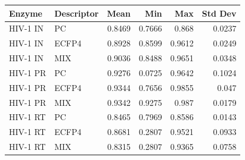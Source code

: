 \begin{tabular}{llrrrr}
\toprule
Enzyme & Descriptor & Mean & Min & Max & Std Dev \\
\midrule
HIV-1 IN & PC & 0.8469 & 0.7666 & 0.868 & 0.0237 \\
HIV-1 IN & ECFP4 & 0.8928 & 0.8599 & 0.9612 & 0.0249 \\
HIV-1 IN & MIX & 0.9036 & 0.8488 & 0.9651 & 0.0348 \\
HIV-1 PR & PC & 0.9276 & 0.0725 & 0.9642 & 0.1024 \\
HIV-1 PR & ECFP4 & 0.9344 & 0.7656 & 0.9855 & 0.047 \\
HIV-1 PR & MIX & 0.9342 & 0.9275 & 0.987 & 0.0179 \\
HIV-1 RT & PC & 0.8465 & 0.7969 & 0.8586 & 0.0143 \\
HIV-1 RT & ECFP4 & 0.8681 & 0.2807 & 0.9521 & 0.0933 \\
HIV-1 RT & MIX & 0.8315 & 0.2807 & 0.9365 & 0.0758 \\
\bottomrule
\end{tabular}
